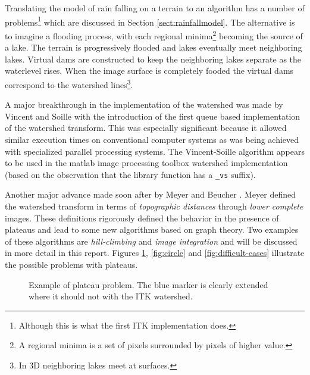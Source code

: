 \documentclass{InsightArticle}
\begin{document}
Translating the model of rain falling on a terrain to an algorithm has
a number of problems\footnote{Although this is what the first ITK
implementation does.} which are discussed in Section
\ref{sect:rainfallmodel}. The alternative is to imagine a flooding
process, with each regional minima\footnote{A regional minima is a set
of pixels surrounded by pixels of higher value.} becoming the source
of a lake. The terrain is progressively flooded and lakes eventually
meet neighboring lakes. Virtual dams are constructed to keep the
neighboring lakes separate as the waterlevel rises. When the image
surface is completely fooded the virtual dams correspond to the
watershed lines\footnote{In 3D neighboring lakes meet at surfaces.}.

A major breakthrough in the implementation of the watershed was made
by Vincent and Soille \cite{Vincent91a} with the introduction of the
first queue based implementation of the watershed transform. This was
especially significant because it allowed similar execution times on
conventional computer systems as was being achieved with specialized
parallel processing systems. The Vincent-Soille algorithm appears to
be used in the matlab image processing toolbox watershed
implementation (based on the observation that the library function has
a {\tt \_vs} suffix).

Another major advance made soon after by Meyer and Beucher
\cite{Beucher93a,Meyer1994a}. Meyer defined the watershed transform in terms of {\em
topographic distances} through {\em lower complete} images. These
definitions rigorously defined the behavior in the presence of
plateaus and lead to some new algorithms based on graph theory. Two
examples of these algorithms are {\em hill-climbing} and {\em image
integration} and will be discussed in more detail in this report.
Figures \ref{fig:cthead1-markers}, \ref{fig:circle} and \ref{fig:difficult-cases} illustrate
the possible problems with plateaus.

\begin{figure}[htbp]
\begin{center}
\caption{Example of plateau problem. The blue marker is clearly extended where it should not with the ITK watershed.\label{fig:cthead1-markers}}
\end{center}
\end{figure}
\end{document}
